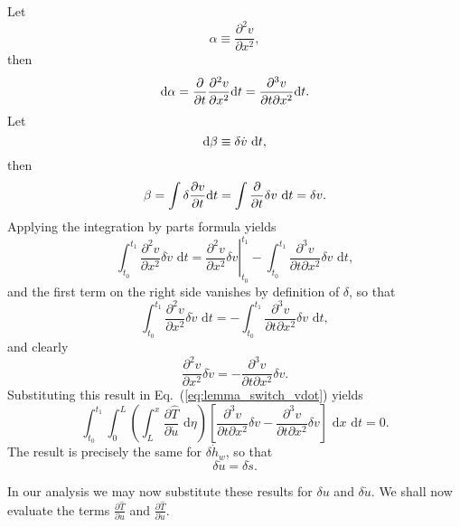 Let
\begin{equation}
\alpha \equiv \frac{\partial^2 v}{\partial x^2},
\end{equation}
then
\begin{equation}
\text d\alpha = \frac{\partial}{\partial t}\frac{\partial^2 v}{\partial x^2}\text dt = \frac{\partial^3 v}{\partial t\partial x^2}\text dt.
\end{equation}
Let
\begin{equation}
\text d\beta \equiv \delta\dot v\text{ d}t,
\end{equation}
then
\begin{equation}
\beta = \int \delta\frac{\partial v}{\partial t}\text dt = \int\frac{\partial}{\partial t} \delta v\text{ d}t = \delta v.
\end{equation}
Applying the integration by parts formula yields
\begin{equation}
\int_{t_0}^{t_1}\frac{\partial^2 v}{\partial x^2}\delta \dot v\text{ d}t = \left.\frac{\partial^2v}{\partial x^2}\delta v\right|_{t_0}^{t_1} - \int_{t_0}^{t_1}\frac{\partial^3 v}{\partial t\partial x^2}\delta v\text{ d}t,
\end{equation}
and the first term on the right side vanishes by definition of $\delta$, so that 
\begin{equation}
\int_{t_0}^{t_1}\frac{\partial^2 v}{\partial x^2}\delta \dot v\text{ d}t =- \int_{t_0}^{t_1}\frac{\partial^3 v}{\partial t\partial x^2}\delta v\text{ d}t,
\end{equation}
and clearly
\begin{equation}
\frac{\partial^2 v}{\partial x^2}\delta \dot v=-\frac{\partial^3 v}{\partial t\partial x^2}\delta v.
\end{equation}
Substituting this result in Eq.~(\ref{eq:lemma_switch_vdot}) yields
\begin{equation}
\int_{t_0}^{t_1}\int_0^L\left(\int_L^x\frac{\partial\hat T}{\partial \dot u}\text{ d}\eta\right)\left[\frac{\partial^3v}{\partial t\partial x^2}\delta v-\frac{\partial^3v}{\partial t\partial x^2}\delta v\right]\text{ d}x\text{ d}t = 0.
\end{equation}
The result is precisely the same for $\delta\dot h_w$, so that 
\begin{equation}
\delta\dot u = \delta\dot s.
\end{equation}

In our analysis we may now substitute these results for $\delta u$ and $\delta\dot u$. We shall now evaluate the terms $\frac{\partial \hat T}{\partial u}$ and $\frac{\partial \hat T}{\partial \dot u}$.

